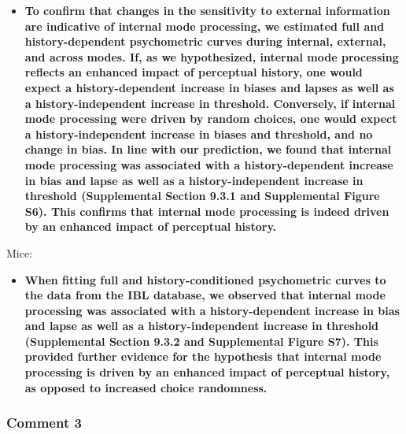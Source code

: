 \documentclass[
]{article}
\providecommand{\tightlist}{%
  \setlength{\itemsep}{0pt}\setlength{\parskip}{0pt}}
\begin{document}
\begin{itemize}
\tightlist
\item
  \textbf{To confirm that changes in the sensitivity to external
  information are indicative of internal mode processing, we estimated
  full and history-dependent psychometric curves during internal,
  external, and across modes. If, as we hypothesized, internal mode
  processing reflects an enhanced impact of perceptual history, one
  would expect a history-dependent increase in biases and lapses as well
  as a history-independent increase in threshold. Conversely, if
  internal mode processing were driven by random choices, one would
  expect a history-independent increase in biases and threshold, and no
  change in bias. In line with our prediction, we found that internal
  mode processing was associated with a history-dependent increase in
  bias and lapse as well as a history-independent increase in threshold
  (Supplemental Section 9.3.1 and Supplemental Figure S6). This confirms
  that internal mode processing is indeed driven by an enhanced impact
  of perceptual history.}
\end{itemize}

Mice:

\begin{itemize}
\tightlist
\item
  \textbf{When fitting full and history-conditioned psychometric curves
  to the data from the IBL database, we observed that internal mode
  processing was associated with a history-dependent increase in bias
  and lapse as well as a history-independent increase in threshold
  (Supplemental Section 9.3.2 and Supplemental Figure S7). This provided
  further evidence for the hypothesis that internal mode processing is
  driven by an enhanced impact of perceptual history, as opposed to
  increased choice randomness.}
\end{itemize}

\hypertarget{comment-3-1}{%
\subsubsection{Comment 3}\label{comment-3-1}}
\end{document}
